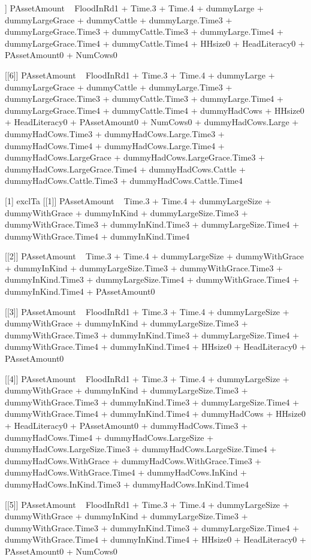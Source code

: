 \begin{Schunk}
\begin{Soutput}
[[5]]
PAssetAmount ~ FloodInRd1 + Time.3 + Time.4 + dummyLarge + dummyLargeGrace + 
    dummyCattle + dummyLarge.Time3 + dummyLargeGrace.Time3 + 
    dummyCattle.Time3 + dummyLarge.Time4 + dummyLargeGrace.Time4 + 
    dummyCattle.Time4 + HHsize0 + HeadLiteracy0 + PAssetAmount0 + 
    NumCows0

[[6]]
PAssetAmount ~ FloodInRd1 + Time.3 + Time.4 + dummyLarge + dummyLargeGrace + 
    dummyCattle + dummyLarge.Time3 + dummyLargeGrace.Time3 + 
    dummyCattle.Time3 + dummyLarge.Time4 + dummyLargeGrace.Time4 + 
    dummyCattle.Time4 + dummyHadCows + HHsize0 + HeadLiteracy0 + 
    PAssetAmount0 + NumCows0 + dummyHadCows.Large + dummyHadCows.Time3 + 
    dummyHadCows.Large.Time3 + dummyHadCows.Time4 + dummyHadCows.Large.Time4 + 
    dummyHadCows.LargeGrace + dummyHadCows.LargeGrace.Time3 + 
    dummyHadCows.LargeGrace.Time4 + dummyHadCows.Cattle + dummyHadCows.Cattle.Time3 + 
    dummyHadCows.Cattle.Time4

[1] exclTa
[[1]]
PAssetAmount ~ Time.3 + Time.4 + dummyLargeSize + dummyWithGrace + 
    dummyInKind + dummyLargeSize.Time3 + dummyWithGrace.Time3 + 
    dummyInKind.Time3 + dummyLargeSize.Time4 + dummyWithGrace.Time4 + 
    dummyInKind.Time4

[[2]]
PAssetAmount ~ Time.3 + Time.4 + dummyLargeSize + dummyWithGrace + 
    dummyInKind + dummyLargeSize.Time3 + dummyWithGrace.Time3 + 
    dummyInKind.Time3 + dummyLargeSize.Time4 + dummyWithGrace.Time4 + 
    dummyInKind.Time4 + PAssetAmount0

[[3]]
PAssetAmount ~ FloodInRd1 + Time.3 + Time.4 + dummyLargeSize + 
    dummyWithGrace + dummyInKind + dummyLargeSize.Time3 + dummyWithGrace.Time3 + 
    dummyInKind.Time3 + dummyLargeSize.Time4 + dummyWithGrace.Time4 + 
    dummyInKind.Time4 + HHsize0 + HeadLiteracy0 + PAssetAmount0

[[4]]
PAssetAmount ~ FloodInRd1 + Time.3 + Time.4 + dummyLargeSize + 
    dummyWithGrace + dummyInKind + dummyLargeSize.Time3 + dummyWithGrace.Time3 + 
    dummyInKind.Time3 + dummyLargeSize.Time4 + dummyWithGrace.Time4 + 
    dummyInKind.Time4 + dummyHadCows + HHsize0 + HeadLiteracy0 + 
    PAssetAmount0 + dummyHadCows.Time3 + dummyHadCows.Time4 + 
    dummyHadCows.LargeSize + dummyHadCows.LargeSize.Time3 + dummyHadCows.LargeSize.Time4 + 
    dummyHadCows.WithGrace + dummyHadCows.WithGrace.Time3 + dummyHadCows.WithGrace.Time4 + 
    dummyHadCows.InKind + dummyHadCows.InKind.Time3 + dummyHadCows.InKind.Time4

[[5]]
PAssetAmount ~ FloodInRd1 + Time.3 + Time.4 + dummyLargeSize + 
    dummyWithGrace + dummyInKind + dummyLargeSize.Time3 + dummyWithGrace.Time3 + 
    dummyInKind.Time3 + dummyLargeSize.Time4 + dummyWithGrace.Time4 + 
    dummyInKind.Time4 + HHsize0 + HeadLiteracy0 + PAssetAmount0 + 
    NumCows0


\end{Soutput}
\end{Schunk}
